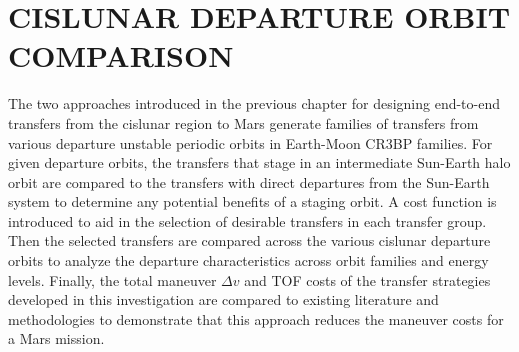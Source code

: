 \chapter{CISLUNAR DEPARTURE ORBIT COMPARISON}

The two approaches introduced in the previous chapter for designing end-to-end transfers from the
cislunar region to Mars generate families of transfers from various departure unstable periodic
orbits in Earth-Moon CR3BP families. For given departure orbits, the transfers that stage
in an intermediate Sun-Earth halo orbit are compared to the transfers with direct departures from
the Sun-Earth system to determine any potential benefits of a staging orbit. A cost function is
introduced to aid in the selection of desirable transfers in each transfer group. Then the selected
transfers are compared across the various cislunar departure orbits to analyze the departure
characteristics across orbit families and energy levels. Finally, the total maneuver $\Delta v$
and TOF costs of the transfer strategies developed in this investigation are compared to existing
literature and methodologies to demonstrate that this approach reduces the maneuver costs for a
Mars mission.




